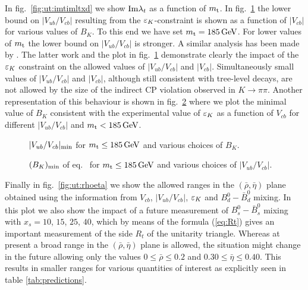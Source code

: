 In fig.\ \ref{fig:ut:imtimltxd} we show ${\rm Im}\lambda_t$ as a function of
$m_{\rm t}$. In fig.\ \ref{fig:ut:vubcbmin} the lower bound on
$|V_{ub}/V_{cb}|$ resulting from the $\varepsilon_K$-constraint is shown as a
function of $|V_{cb}|$ for various values of $B_K$. To this end we have
set $m_{\rm t}=185\, {\rm GeV}$.  For lower values of $m_{\rm t}$ the lower bound on
$|V_{ub}/V_{cb}|$ is stronger.  A similar analysis has been made by
\cite{herrlichnierste:95}. The latter work and the plot in
fig.\ \ref{fig:ut:vubcbmin} demonstrate clearly the impact of the
$\varepsilon_K$ constraint on the allowed values of $|V_{ub}/V_{cb} |$ and
$|V_{cb}|$.  Simultaneously small values of $|V_{ub}/V_{cb} |$ and $|
V_{cb}|$, although still consistent with tree-level decays, are not
allowed by the size of the indirect CP violation observed in $K \to
\pi\pi$.  Another representation of this behaviour is shown in
fig.\ \ref{fig:ut:bkmin} where we plot the minimal value of $B_{K}$
consistent with the experimental value of $\varepsilon_K$ as a function of
$V_{cb}$ for different $|V_{ub}/V_{cb} |$ and $m_{\rm t} < 185\, {\rm GeV}$.

\begin{figure}[hbt]
\vspace{0.10in}
\centerline{
\epsfysize=5in
 }
\vspace{0.08in}
\caption[]{
$|V_{ub}/V_{cb}|_{\rm min}$ for $m_{\rm t} \le 185\, {\rm GeV}$ and various choices
of $B_K$.
\label{fig:ut:vubcbmin}}
\end{figure}

\begin{figure}[hbt]
\vspace{0.10in}
\centerline{
\epsfysize=5in
 }
\vspace{0.08in}
\caption[]{
$(B_K)_{\rm min}$ of eq.\  for $m_{\rm t} \le 185\, {\rm GeV}$ and
various choices of $|V_{ub}/V_{cb}|$.
\label{fig:ut:bkmin}}
\end{figure}

Finally in fig.\ \ref{fig:ut:rhoeta} we show the allowed ranges in the
$(\bar\rho,\bar\eta)$ plane obtained using the information from
$V_{cb}$, $|V_{ub}/V_{cb}|$, $\varepsilon_K$ and $B^0_d-\bar B^0_d$ mixing.
In this plot we also show the impact of a future measurement of
$B^0_s-\bar B^0_s$ mixing with $x_s=10$, $15$, $25$, $40$, which by
means of the formula (\ref{eq:Rt}) gives an important measurement of
the side $R_t$ of the unitarity triangle. Whereas at present a broad
range in the $(\bar\rho,\bar\eta)$ plane is allowed, the situation
might change in the future allowing only the values $0 \le \bar \rho
\le 0.2$ and $0.30 \le \bar \eta \le 0.40$.  This results in smaller
ranges for various quantities of interest as explicitly seen in table
\ref{tab:predictions}.

